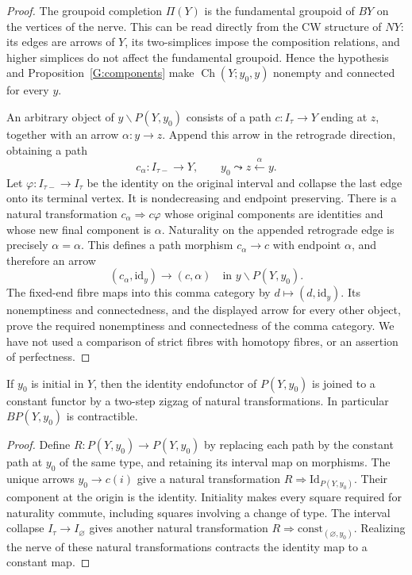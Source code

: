 \begin{proof}
The groupoid completion $\Pi(Y)$ is the fundamental groupoid of $BY$ on the vertices of the nerve. This can be read directly from the CW structure of $NY$: its edges are arrows of $Y$, its two-simplices impose the composition relations, and higher simplices do not affect the fundamental groupoid. Hence the hypothesis and Proposition~\ref{G:components} make $\operatorname{Ch}(Y;y_0,y)$ nonempty and connected for every $y$.

An arbitrary object of $y\backslash P(Y,y_0)$ consists of a path $c:I_\tau\to Y$ ending at $z$, together with an arrow $\alpha:y\to z$. Append this arrow in the retrograde direction, obtaining a path
\[
 c_\alpha:I_{\tau-}\longrightarrow Y,
 \qquad y_0\leadsto z\xleftarrow{\alpha}y.
\]
Let $\varphi:I_{\tau-}\to I_\tau$ be the identity on the original interval and collapse the last edge onto its terminal vertex. It is nondecreasing and endpoint preserving. There is a natural transformation $c_\alpha\Rightarrow c\varphi$ whose original components are identities and whose new final component is $\alpha$. Naturality on the appended retrograde edge is precisely $\alpha=\alpha$. This defines a path morphism $c_\alpha\to c$ with endpoint $\alpha$, and therefore an arrow
\[
 (c_\alpha,\mathrm{id}_y)\longrightarrow(c,\alpha)
 \quad\text{in }y\backslash P(Y,y_0).
\]
The fixed-end fibre maps into this comma category by $d\mapsto(d,\mathrm{id}_y)$. Its nonemptiness and connectedness, and the displayed arrow for every other object, prove the required nonemptiness and connectedness of the comma category. We have not used a comparison of strict fibres with homotopy fibres, or an assertion of perfectness.
\end{proof}

\begin{proposition}\label{G:contraction}
If $y_0$ is initial in $Y$, then the identity endofunctor of $P(Y,y_0)$ is joined to a constant functor by a two-step zigzag of natural transformations. In particular $BP(Y,y_0)$ is contractible.
\end{proposition}

\begin{proof}
Define $R:P(Y,y_0)\to P(Y,y_0)$ by replacing each path by the constant path at $y_0$ of the same type, and retaining its interval map on morphisms. The unique arrows $y_0\to c(i)$ give a natural transformation $R\Rightarrow\mathrm{Id}_{P(Y,y_0)}$. Their component at the origin is the identity. Initiality makes every square required for naturality commute, including squares involving a change of type. The interval collapse $I_\tau\to I_{\varnothing}$ gives another natural transformation $R\Rightarrow\mathrm{const}_{(\varnothing,y_0)}$. Realizing the nerve of these natural transformations contracts the identity map to a constant map.
\end{proof}

